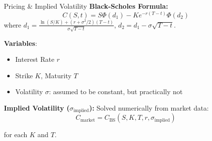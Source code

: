 \documentclass{beamer}
\begin{document}
\begin{frame}{Pricing \& Implied Volatility}
\textbf{Black-Scholes Formula:} 
\[
C(S, t) = S \Phi(d_1) - K e^{-r(T-t)} \Phi(d_2)
\]
where \(d_1 = \frac{\ln(S/K) + (r + \sigma^2/2)(T-t)}{\sigma\sqrt{T-t}}\), \(d_2 = d_1 - \sigma\sqrt{T-t}\).\\
\vspace{0.3cm}

\textbf{Variables}: 
\begin{itemize}
    \item Interest Rate $r$
    \item Strike $K$, Maturity $T$
    \item Volatility $\sigma$: assumed to be constant, but practically not
\end{itemize}
\textbf{Implied Volatility (\(\sigma_{\text{implied}}\)):} Solved numerically from market data:
\[
C_{\text{market}} = C_{\text{BS}}(S, K, T, r, \sigma_{\text{implied}})
\]

for each $K$ and $T$.
\end{frame}
\end{document}
